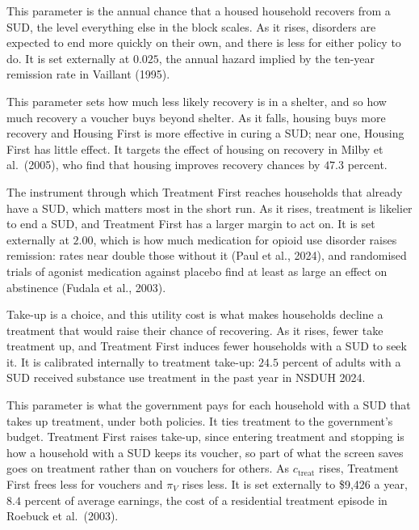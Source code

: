 \documentclass[10pt]{article}
\begin{document}
\begin{description}\setlength{\itemsep}{0.25em}\setlength{\parskip}{0em}
\item[$\bar\pi_r$, the baseline SUD recovery rate.] This parameter is the annual chance that a housed household recovers from a SUD, the level everything else in the block scales. As it rises, disorders are expected to end more quickly on their own, and there is less for either policy to do. It is set externally at $0.025$, the annual hazard implied by the ten-year remission rate in Vaillant (1995).
\item[$\mu_H$, SUD recovery when homeless.] This parameter sets how much less likely recovery is in a shelter, and so how much recovery a voucher buys beyond shelter. As it falls, housing buys more recovery and Housing First is more effective in curing a SUD; near one, Housing First has little effect. It targets the effect of housing on recovery in Milby et al.\ (2005), who find that housing improves recovery chances by $47.3$ percent.
\item[$g$, the treatment effect on recovery.] The instrument through which Treatment First reaches households that already have a SUD, which matters most in the short run. As it rises, treatment is likelier to end a SUD, and Treatment First has a larger margin to act on. It is set externally at $2.00$, which is how much medication for opioid use disorder raises remission: rates near double those without it (Paul et al., 2024), and randomised trials of agonist medication against placebo find at least as large an effect on abstinence (Fudala et al., 2003).
\item[$\bar\tau^{u}$, the utility cost of treatment.] Take-up is a choice, and this utility cost is what makes households decline a treatment that would raise their chance of recovering. As it rises, fewer take treatment up, and Treatment First induces fewer households with a SUD to seek it. It is calibrated internally to treatment take-up: $24.5$ percent of adults with a SUD received substance use treatment in the past year in NSDUH 2024.
\item[$c_{\text{treat}}$, the public cost of a year of treatment.] This parameter is what the government pays for each household with a SUD that takes up treatment, under both policies. It ties treatment to the government's budget. Treatment First raises take-up, since entering treatment and stopping is how a household with a SUD keeps its voucher, so part of what the screen saves goes on treatment rather than on vouchers for others. As $c_{\text{treat}}$ rises, Treatment First frees less for vouchers and $\pi_V$ rises less. It is set externally to \$9,426 a year, $8.4$ percent of average earnings, the cost of a residential treatment episode in Roebuck et al.\ (2003).
\end{description}
\end{document}
